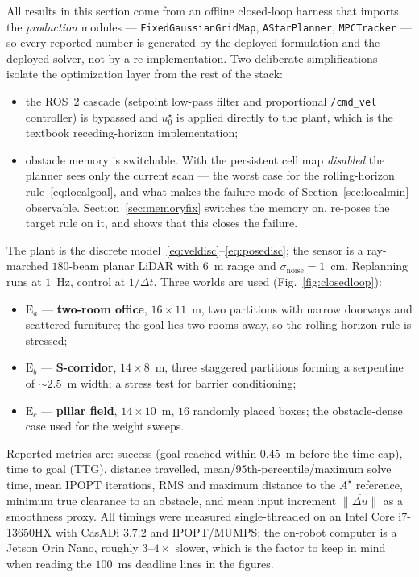 \documentclass[11pt,a4paper]{article}
\newcommand{\astar}{$A^\star$}
\begin{document}
All results in this section come from an offline closed-loop harness that imports the \emph{production}
modules --- \texttt{FixedGaussianGridMap}, \texttt{AStarPlanner}, \texttt{MPCTracker} --- so every reported
number is generated by the deployed formulation and the deployed solver, not by a re-implementation. Two
deliberate simplifications isolate the optimization layer from the rest of the stack:
\begin{itemize}
  \item the ROS~2 cascade (setpoint low-pass filter and proportional \texttt{/cmd\_vel} controller) is
        bypassed and $u^\star_0$ is applied directly to the plant, which is the textbook receding-horizon
        implementation;
  \item obstacle memory is switchable. With the persistent cell map \emph{disabled} the planner sees only
        the current scan --- the worst case for the rolling-horizon rule~\eqref{eq:localgoal}, and what
        makes the failure mode of Section~\ref{sec:localmin} observable. Section~\ref{sec:memoryfix}
        switches the memory on, re-poses the target rule on it, and shows that this closes the failure.
\end{itemize}
The plant is the discrete model~\eqref{eq:veldisc}--\eqref{eq:posedisc}; the sensor is a ray-marched $180$-beam
planar LiDAR with $6$~m range and $\sigma_{\mathrm{noise}}=1$~cm. Replanning runs at $1$~Hz, control at
$1/\Delta t$. Three worlds are used (Fig.~\ref{fig:closedloop}):

\begin{itemize}
  \item $\mathrm{E}_a$ --- \textbf{two-room office}, $16\times11$~m, two partitions with narrow doorways and
        scattered furniture; the goal lies two rooms away, so the rolling-horizon rule is stressed;
  \item $\mathrm{E}_b$ --- \textbf{S-corridor}, $14\times8$~m, three staggered partitions forming a
        serpentine of ${\sim}2.5$~m width; a stress test for barrier conditioning;
  \item $\mathrm{E}_c$ --- \textbf{pillar field}, $14\times10$~m, $16$ randomly placed boxes; the
        obstacle-dense case used for the weight sweeps.
\end{itemize}

Reported metrics are: success (goal reached within $0.45$~m before the time cap), time to goal (TTG),
distance travelled, mean/95th-percentile/maximum solve time, mean IPOPT iterations, RMS and maximum distance
to the \astar{} reference, minimum true clearance to an obstacle, and mean input increment
$\overline{\|\Delta u\|}$ as a smoothness proxy. All timings were measured single-threaded on an Intel Core
i7-13650HX with CasADi $3.7.2$ and IPOPT/MUMPS; the on-robot computer is a Jetson Orin Nano, roughly
$3$--$4\times$ slower, which is the factor to keep in mind when reading the $100$~ms deadline lines in the
figures.
\end{document}
